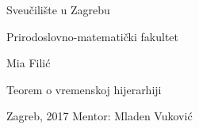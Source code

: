 \begin{center}
\thispagestyle{empty}
{\Large Sveučilište u Zagrebu}
\par\end{center}{\Large \par}

\begin{center}
{\Large Prirodoslovno-matematički fakultet}
\par\end{center}{\Large \par}

\smallskip{}

\vfill{}

\begin{center}
\Large Mia Filić
\par\end{center}{\Large \par}

\medskip{}


\begin{center}
\LARGE 
Teorem o vremenskoj hijerarhiji
\par\end{center}{\huge \par}

\bigskip{}

\vfill{}
Zagreb, 2017     \hfill{} Mentor: Mladen Vuković
\newpage

\thispagestyle{empty}